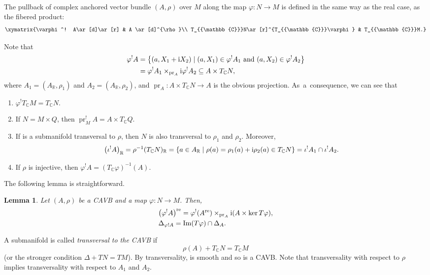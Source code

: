 \documentclass[pdftex]{sigma}
\numberwithin{equation}{section}
\newtheorem{Lemma}[Theorem]{Lemma}
\newcommand{\R}{{\mathbb{R}}}
\newcommand{\C}{{\mathbb{C}}}
\DeclareMathOperator{\im}{Im}
\DeclareMathOperator{\pr}{pr}
\DeclareMathOperator{\real}{re}
\begin{document}
The pullback of complex anchored vector bundle $(A, \rho) $ over $M$ along the map $\varphi\colon N\to M$ is defined in the same way as the real case, as the fibered product:
\[
\xymatrix{\varphi^! A\ar[d]\ar[r] & A \ar[d]^{\rho}\\
T_{\C}N\ar[r]^{T_{\C}\varphi} & T_{\C}M.}
\]

Note that
\begin{align*}
\varphi^! A&{}=\bigl\{(a, X_1+{\rm i}X_2) \mid  (a,X_1)\in \varphi^! A_1\ \text{and}\ (a,X_2)\in \varphi^! A_2\bigr\}\\
&{}=\varphi^! A_1 \times_{\pr_A} {\rm i}\varphi^! A_2\subseteq A\times T_{\C}N,
\end{align*}
where $A_1=(A_{\R}, \rho_1)$ and $A_2=(A_{\R}, \rho_2)$, and $\pr_A\colon A\times T_{\C}N\to A$ is the obvious projection.
As~a~consequence, we can see that
\begin{enumerate}\itemsep=0pt
\item $\varphi^!T_{\C}M=T_{\C}N$.
\item If $N=M\times Q$, then $\pr_M ^! A=A\times T_{\C}Q$.
\item If  is a submanifold transversal to $\rho$, then $N$ is also transversal to $\rho_1$ and $\rho_2$. Moreover,
\[
\bigl(\iota^! A\bigr)_{\R}=\rho^{-1}(T_{\C}N)_{\R}=\{a\in A_{\R}\mid \rho(a)=\rho_1(a)+{\rm i}\rho_2(a)\in T_{\C}N\}=\iota^{!}A_1\cap \iota^{!}A_2.
\]
\item If $\rho$ is injective, then $\varphi^! A=(T_{\C}\varphi)^{-1}(A)$.
\end{enumerate}

 The following lemma is straightforward.

\begin{Lemma}\label{repartbackward}
Let $(A,\rho)$ be a CAVB and a map $\varphi\colon N\to M$. Then,
\begin{align*} %
&\bigl(\varphi^! A\bigr)^{\real}=\varphi^! (A^{\real})\times_{\pr_A}{\rm i}(A\times \ker T\varphi),\\
&\Delta_{\varphi! A}=\im(T\varphi)\cap \Delta_{A}.
\end{align*}
\end{Lemma}

A submanifold  is called {\em transversal to the CAVB} if
\[\rho(A)+T_{\C}N=T_{\C}M\]
(or the stronger condition $\Delta+TN=TM$). By transversality,  is smooth and so is a CAVB. Note that transversality with respect to $\rho$ implies transversality with respect to $A_1$ and $A_2$.
\end{document}
